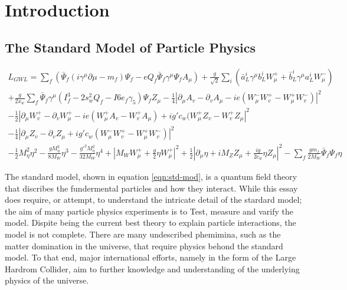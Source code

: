 \section{Introduction}

	\subsection{The Standard Model of Particle Physics}

    \begin{multline} \label{eqn:std-mod}
      L_{GWL} = \sum_{f} ( \bar{\Psi}_{f} ( i \gamma^\mu \partial \mu - m_{f} ) \Psi_{f} - eQ_{f} \bar{\Psi}_{f} \gamma^\mu \Psi_{f} A_{\mu} ) + \frac{g}{\sqrt{2}} \sum_{i} ( \bar{a}^i_L \gamma^\mu b^i_L W^+_\mu + \bar{b}^i_L \gamma^\mu a^i_L W^-_\mu )                        \\                           
              + \frac{g}{2x_w} \sum_f \bar{\Psi}_f \gamma^\mu ( I^3_f - 2s^2_w Q_f - I6e_f \gamma_5 ) \Psi_f Z_\mu - \frac{1}{4} | \partial_\mu A_v - \partial_v A_\mu - ie(W^-_\mu W^+_v - W^+_\mu W^-_v ) |^2                                         \\                                     
              - \frac{1}{2} | \partial_\mu W^+_v - \partial_v W^+_\mu - ie ( W^+_\mu A_v - W^+_v A_\mu ) + ig' c_w (W^+_\mu Z_v - W^+_v Z_\mu |^2 \\
              - \frac{1}{4} | \partial_\mu Z_v - \partial_v Z_\mu + ig' c_w (W^-_\mu W^+_v - W^+_\mu W^-_v ) |^2                                   \\     
              - \frac{1}{2} M^2_\eta \eta^2 - \frac{gM^2_\eta}{8M_W} \eta^3 - \frac{g'^2 M^2_\eta}{32M_W}\eta^4 + | M_W W^+_\mu + \frac{g}{2} \eta W^+_\mu |^2 + \frac{1}{2} | \partial_\mu \eta + i M_Z Z_\mu + \frac{ig}{2c_w} \eta Z_\mu |^2 - \sum_f \frac{g m_f}{2 M_W} \bar{\Psi}_f \Psi_f \eta                                                                                 
    \end{multline}

    The standard model, shown in equation \ref{eqn:std-mod}, is a quantum field theory that discribes the fundermental particles and how they interact.
    While this essay does require, or attempt, to understand the intricate detail of the stardard model;
    the aim of many particle physics experiments is to Test, measure and varify the model.
    Dispite being the current best theory to explain particle interactions, the model is not complete.
    There are many undescribed phemimina, such as the matter domination in the universe, that require physics behond the standard model.
    To that end, major international efforts, namely in the form of the Large Hardrom Collider, aim to further knowledge and understanding of the underlying physics of the universe. \cite{stdMod}

